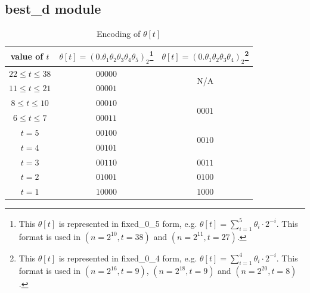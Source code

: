 \documentclass[10pt,journal,compsoc]{IEEEtran}
\begin{document}
\subsection{best\_d module}
\renewcommand{\arraystretch}{1.2}
\begin{table}[!htb]\centering
\caption{Encoding of $\theta[t]$}\label{tab:encode_theta}
\begin{minipage}{.48\textwidth}\centering
\begin{tabular}{ccc}
\hline
    value of $t$                &  $\theta[t]=(0.\theta_1\theta_2\theta_3\theta_4\theta_5)_2$\footnote[$\ast$]{This $\theta[t]$ is represented in fixed\_0\_5 form, e.g. $\theta[t]=\sum_{i=1}^{5}\theta_i\cdot 2^{-i}$. This format is used in $(n=2^{10},t=38)$ and $(n=2^{11},t=27)$.} & $\theta[t]=(0.\theta_1\theta_2\theta_3\theta_4)_2$\footnote[$\dagger$]{This $\theta[t]$ is represented in fixed\_0\_4 form, e.g. $\theta[t]=\sum_{i=1}^{4}\theta_i\cdot 2^{-i}$. This format is used in $(n=2^{16},t=9)$, $(n=2^{18},t=9)$ and $(n=2^{20},t=8)$.}\\
\hline
 $22\leq t\leq 38$  &  $00000$ & \multirow{2}{*}{N/A}\\
 $11\leq t\leq 21$  & $00001$  &\\
\hline
 $8\leq t\leq 10$  & $00010$  &\multirow{2}{*}{$0001$}\\
 $6\leq t\leq 7$  & $00011$  &\\
\hline
 $t = 5$  & $00100$  & \multirow{2}{*}{$0010$}    \\
 $t = 4$  & $00101$  &     \\
\hline
 $t = 3$  & $00110$  &  $0011$   \\
 $t = 2$  &$01001$   &  $0100$   \\
 $t = 1$  &$10000$   & $1000$    \\
\hline
\end{tabular}
\end{minipage}
\end{table}
\end{document}
